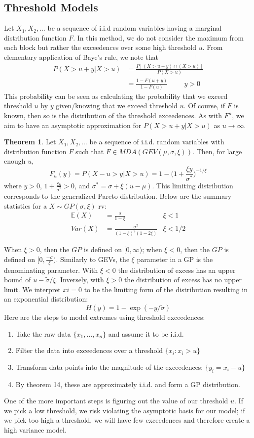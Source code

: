 \documentclass{article}
\theoremstyle{definition}
\newtheorem{theorem}{Theorem}
\theoremstyle{definition}
\def\E{\mathbb{E}}
\def\xs{\{x_1, \hdots, x_n\}}
\begin{document}
\subsection{Threshold Models}
Let $X_1, X_2, \hdots$ be a sequence of i.i.d random variables having a marginal distribution function $F$. In this method, we do not consider the maximum from each block but rather the exceedences over some high threshold $u$. From elementary application of Baye's rule, we note that 
\begin{align*}
    P(X>u+y|X>u)&=\frac{P[(X>u+y)\cap (X>u)]}{P(X>u)}\\
    &=\frac{1-F(u+y)}{1-F(u)} \hspace{1cm} y>0
\end{align*}
This probability can be seen as calculating the probability that we exceed threshold $u$ by $y$ given/knowing that we exceed threshold $u$. Of course, if $F$ is known, then so is the distribution of the threshold exceedences. As with $F^n$, we aim to have an asymptotic approximation for $P(X>u+y|X>u)$ as $u \rightarrow \infty$.
\begin{theorem}
Let $X_1,X_2,\hdots$ be a sequence of i.i.d. random variables with distribution function $F$ such that $F\in MDA(GEV(\mu,\sigma, \xi))$. Then, for large enough $u$,
\[F_u(y)= P(X-u>y|X>u)= 1-\bigg(1+\frac{\xi y}{\sigma^*} \bigg)^{-1/\xi}\]
where $y>0$, $1+\frac{\xi y}{\sigma^*} >0$, and $\sigma^*= \sigma+ \xi(u-\mu)$.
This limiting distribution corresponds to the generalized Pareto distribution. Below are the summary statistics for a $X\sim GP(\sigma, \xi)$ rv:
\begin{align*}
    \E(X)&=\frac{\sigma}{1-\xi} &\xi<1\\
    Var(X)&= \frac{\sigma^2}{(1-\xi)^2(1-2\xi)}&\xi<1/2
\end{align*}
\end{theorem}
When $\xi>0$, then the $GP$ is defined on $[0,\infty)$; when $\xi<0$, then the $GP$ is defined on $[0,\frac{-\sigma}{\xi})$. Similarly to GEVs, the $\xi$ parameter in a GP is the denominating parameter. With $\xi<0$ the distribution of excess has an upper bound of $u- \tilde{\sigma}/\xi$. Inversely, with $\xi>0$ the distribution of excess has no upper limit. We interpret $xi=0$ to be the limiting form of the distribution resulting in an exponential distribution:
\[H(y)= 1-\exp(-y/\tilde{\sigma})\]
Here are the steps to model extremes using threshold exceedences:
\begin{enumerate}
    \item Take the raw data $\xs$ and assume it to be i.i.d.
    \item Filter the data into exceedences over a threshold $\{x_i: x_i>u\}$
    \item Transform data points into the magnitude of the exceedences: $\{y_i =x_i-u\}$
    \item By theorem 14, these are approximately i.i.d. and form a GP distribution.
\end{enumerate}
One of the more important steps is figuring out the value of our threshold $u$. If we pick a low threshold, we risk violating the asymptotic basis for our model; if we pick too high a threshold, we will have few exceedences and therefore create a high variance model.
\end{document}
